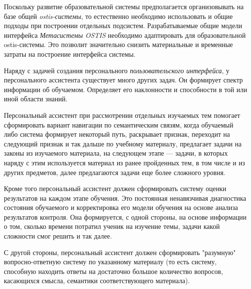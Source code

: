 Поскольку развитие образовательной системы предполагается организовывать на базе общей \textit{ostis-системы}, то естественно необходимо использовать и общие подходы при построении отдельных подсистем. Разрабатываемые общие модели интерфейса \textit{Метасистемы OSTIS} необходимо адаптировать для образовательной ostis-системы. Это позволит значительно снизить материальные и временные затраты на построение интерфейса системы.

Наряду с задачей создания персонального \textit{пользовательского интерфейса}, у персонального ассистента существует много других задач. Он формирует спектр информации об обучаемом. Определяет его наклонности и способности в той или иной области знаний.

Персональный ассистент при рассмотрении отдельных изучаемых тем помогает сформировать вариант навигации по семантическим связям, когда обучаемый либо система формирует некоторый путь, раскрывает признак, переходит на следующий признак и так дальше по учебному материалу, предлагает задачи на законы из изучаемого материала, на следующем этапе --- задачи, в которых наряду с этим используется материал из ранее пройденных тем, в том числе и из других предметов, далее предлагаются задачи еще более сложного уровня. 

Кроме того персональный ассистент должен сформировать систему оценки результатов на каждом этапе обучения. Это постоянная ненавязчивая диагностика состояния обучаемого и корректировка его модели обучения на основе анализа результатов контроля. Она формируется, с одной стороны, на основе информации о том, сколько времени потратил ученик на изучение темы, задачи какой сложности смог решить и так далее.

С другой стороны, персональный ассистент должен сформировать "разумную"{} вопросно-ответную систему по указанному материалу (то есть систему, способную находить ответы на достаточно большое количество вопросов, касающихся смысла, семантики соответствующего материала).

